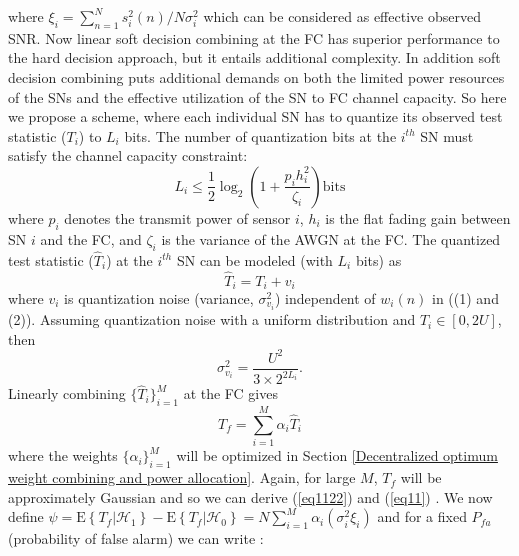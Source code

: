 \documentclass[conference]{IEEEtran}
\begin{document}
where $\xi_i =\sum \limits_{n=1}^N  s_i^{2}\left(n\right)/N\sigma_i^{2}$ which can be considered as effective observed SNR. Now linear soft decision combining at the FC has superior performance to the hard decision approach, but it entails additional complexity. In addition soft decision combining puts additional demands on both the limited power resources of the SNs and the effective utilization of the SN to FC channel capacity. So here we propose a scheme, where each individual SN has to quantize its observed test statistic ($T_i$) to $L_i$ bits. The number of quantization bits at the $i^{th}$ SN must satisfy the channel capacity constraint:
\begin{equation}\label{eq5}
     L_i\leq\frac{1}{2}\log_2\left(1+\frac{p_i h_i^{2}}{\zeta_i}\right) \mathrm{bits}
\end{equation}
where $p_i$ denotes the transmit power of sensor $i$, $h_i$ is the flat fading gain between SN $i$ and the FC, and $\zeta_i$ is the  variance of the AWGN at the FC.
The quantized test statistic ($\hat T_i$) at the $i^{th}$ SN can be modeled (with $L_i$ bits) as 
\begin{equation}\label{eq6}
     \hat T_i=T_i+v_i
\end{equation}
where $v_i$ is quantization noise (variance, $\sigma_{v_i}^{2}$) independent of $w_i\left(n\right)$ in ((1) and (2)). Assuming quantization noise with a uniform distribution and $T_i\in [0, 2U]$, then
\begin{equation}\label{eq8}
\sigma_{v_i}^{2}=\frac{U^{2}}{3\times 2^{2L_i}}.
\end{equation}
Linearly combining $\displaystyle \Big \{  \hat T_i \Big \}_{i=1}^{M}$ at the FC gives
\begin{equation}\label{eq10}
     T_f=\sum \limits_{i=1}^M \alpha_i \hat T_i
\end{equation}
where the weights $\displaystyle \big \{  \alpha_i\big \}_{i=1}^{M}$ will be optimized in Section \ref{Decentralized optimum weight combining and power allocation}. Again, for large $M$, $T_f$ will be approximately Gaussian and so we can derive (\ref{eq1122}) and (\ref{eq11}) . We now define $\psi=\mathrm{E}\left\{T_f|\mathcal{ H}_1\right\} -\mathrm{E}\left\{T_f|\mathcal{ H}_0\right\}
=N \sum \limits_{i=1}^M \alpha_i  \left( \sigma_i^{2}\xi_i \right)$ and for a fixed $P_{fa}$ (probability of false alarm) we can write \cite{les96}:
\end{document}
